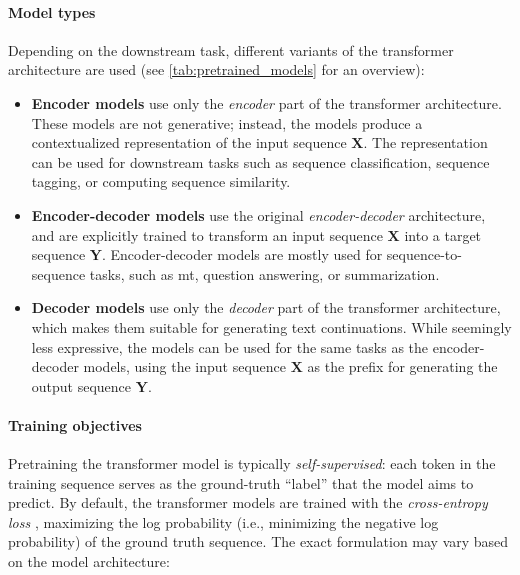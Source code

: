 {\paragraph{Model types} Depending on the downstream task, different variants of the transformer architecture are used (see \autoref{tab:pretrained_models} for an overview):

\begin{itemize}
    \item \textbf{Encoder models} use only the \emph{encoder} part of the transformer architecture. These models are not generative; instead, the models produce a contextualized representation of the input sequence $\mathbf{X}$. The representation can be used for downstream tasks such as sequence classification, sequence tagging, or computing sequence similarity.
    \item \textbf{Encoder-decoder models} use the original \emph{encoder-decoder} architecture, and are explicitly trained to transform an input sequence $\mathbf{X}$ into a target sequence $\mathbf{Y}$. Encoder-decoder models are mostly used for sequence-to-sequence tasks, such as \ac{mt}, question answering, or summarization.
    \item \textbf{Decoder models} use only the \emph{decoder} part of the transformer architecture, which makes them suitable for generating text continuations. While seemingly less expressive, the models can be used for the same tasks as the encoder-decoder models, using the input sequence $\mathbf{X}$ as the prefix for  generating the output sequence $\mathbf{Y}$.
\end{itemize}


\paragraph{Training objectives} Pretraining the transformer model is typically \emph{self-supervised}: each token in the training sequence serves as the ground-truth ``label'' that the model aims to predict. By default, the transformer models are trained with the \emph{cross-entropy loss} \cite[p.92]{jurafsky2024}, maximizing the log probability (i.e., minimizing the negative log probability) of the ground truth sequence. The exact formulation may vary based on the model architecture:


}

